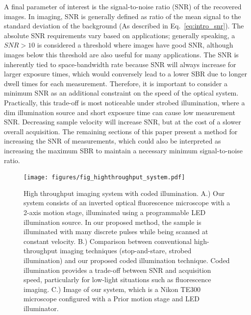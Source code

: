 A final parameter of interest is the signal-to-noise ratio (SNR) of the recovered images. In imaging, SNR is generally defined as ratio of the mean signal to the standard deviation of the background (As described in Eq.~\ref{eq:intro_snr}). The absolute SNR requirements vary based on applications; generally speaking, a $SNR > 10$ is considered a threshold where images have good SNR, although images below this threshold are also useful for many applications. The SNR is inherently tied to space-bandwidth rate because SNR will always increase for larger exposure times, which would conversely lead to a lower SBR due to longer dwell times for each measurement. Therefore, it is important to consider a minimum SNR as an additional constraint on the speed of the optical system. Practically, this trade-off is most noticeable under strobed illumination, where a dim illumination source and short exposure time can cause low measurement SNR. Decreasing sample velocity will increase SNR, but at the cost of a slower overall acquisition. The remaining sections of this paper present a method for increasing the SNR of measurements, which could also be interpreted as increasing the maximum SBR to maintain a necessary minimum signal-to-noise ratio.

\begin{figure}
  \centering
    \texttt{[image: figures/fig\_highthroughput\_system.pdf]}
  \caption{\label{fig:system}High throughput imaging system with coded illumination. A.) Our system consists of an inverted optical fluorescence microscope with a 2-axis motion stage, illuminated using a programmable LED illumination source. In our proposed method, the sample is illuminated with many discrete pulses while being scanned at constant velocity. B.) Comparison between conventional high-throughput imaging techniques (stop-and-stare, strobed illumination) and our proposed coded illumination technique. Coded illumination provides a trade-off between SNR and acquisition speed, particularly for low-light situations such as fluorescence imaging. C.) Image of our system, which is a Nikon TE300 microscope configured with a Prior motion stage and LED illuminator.}

\end{figure}

